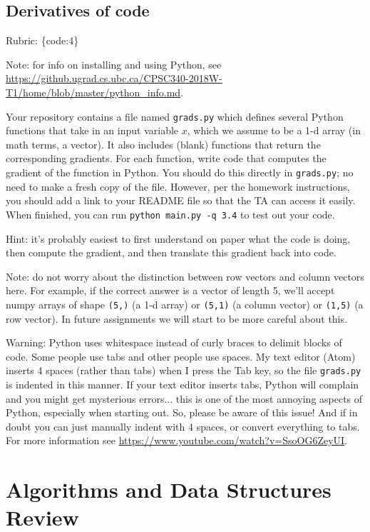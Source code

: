 \documentclass{article}
\def\rubric#1{\gre{Rubric: \{#1\}}}{}
\def\blu#1{{\color{blu}#1}}
\def\gre#1{{\color{gre}#1}}
\begin{document}
\subsection{Derivatives of code}

\rubric{code:4}

Note: for info on installing and using Python, see \\\url{https://github.ugrad.cs.ubc.ca/CPSC340-2018W-T1/home/blob/master/python_info.md}.

Your repository contains a file named \texttt{grads.py} which defines several Python functions that take in an input variable $x$, which we assume to be a 1-d array (in math terms, a vector).
It also includes (blank) functions that return the corresponding gradients.
For each function, \blu{write code that computes the gradient of the function} in Python.
You should do this directly in \texttt{grads.py}; no need to make a fresh copy of the file. However, per the homework instructions, you should add a link to your README file so that the TA can access it easily. When finished, you can run \texttt{python main.py -q 3.4} to test out your code. 

Hint: it's probably easiest to first understand on paper what the code is doing, then compute
the gradient, and then translate this gradient back into code.

Note: do not worry about the distinction between row vectors and column vectors here.
For example, if the correct answer is a vector of length 5, we'll accept numpy arrays
of shape \texttt{(5,)} (a 1-d array) or \texttt{(5,1)} (a column vector) or
\texttt{(1,5)} (a row vector). In future assignments we will start to be more careful
about this.

Warning: Python uses whitespace instead of curly braces to delimit blocks of code.
Some people use tabs and other people use spaces. My text editor (Atom) inserts 4 spaces (rather than tabs) when
I press the Tab key, so the file \texttt{grads.py} is indented in this manner. If your text editor inserts tabs,
Python will complain and you might get mysterious errors... this is one of the most annoying aspects
of Python, especially when starting out. So, please be aware of this issue! And if in doubt you can just manually
indent with 4 spaces, or convert everything to tabs. For more information
see \url{https://www.youtube.com/watch?v=SsoOG6ZeyUI}.


\section{Algorithms and Data Structures Review}
\end{document}
